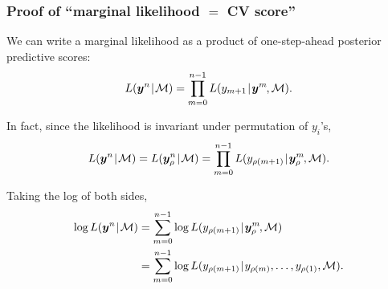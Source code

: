 \documentclass[18pt, handout]{beamer}
\newcommand{\defineTightSpacing}{%
	\setlength{\abovedisplayskip}{.25\baselineskip}%
	\setlength{\belowdisplayskip}{.25\baselineskip}%
}
\renewcommand{\textsc}[1]{{\small \MakeUppercase{#1}}}
\newcommand{\given}{\thinnerspace | \thinnerspace}
\newcommand{\thinnerspace}{\mskip.5\thinmuskip}
\newcommand{\negthinnerspace}{\mskip-.5\thinmuskip}
\newcommand{\likelihood}{L}
\newcommand{\by}{\bm{y}}
\newcommand{\loss}{\mathcal{L}}
\newcommand{\modelSymbol}{\mathcal{M}}
\newcommand{\permutation}{\rho}
\newcommand{\trainingSize}{m}
\newcommand{\testSampleIndex}{i}
\newcommand{\testOutcome}{y_{\permutation(\testSampleIndex)}} %
\newcommand{\testOutcomePredicted}{\widehat{y}_{\permutation(\testSampleIndex)}^{\, \trainingSize}}
\begin{document}
\begin{frame}
\frametitle{Proof of ``marginal likelihood $=$ {\large CV} score''}
We can write a marginal likelihood as a product of one-step-ahead posterior predictive scores:
\vspace*{-.3\baselineskip}
\begin{equation*} \defineTightSpacing%
\likelihood(\by^n \given \modelSymbol)
	= \prod_{m = 0}^{n - 1} \likelihood(y_{\trainingSize + 1} \given \by^\trainingSize\negthinnerspace, \modelSymbol).
\end{equation*}

In fact, since the likelihood is invariant under permutation of $y_i$'s,
\vspace*{-.15\baselineskip}
\begin{equation*} \defineTightSpacing%
\likelihood(\by^n \given \modelSymbol)
	= \likelihood(\by_{\permutation}^n \given \modelSymbol)
	= \prod_{m = 0}^{n - 1} \likelihood(y_{\permutation(\trainingSize + 1)} \given \by_\permutation^\trainingSize\negthinnerspace, \modelSymbol).
\end{equation*}

Taking the log of both sides, 
\begin{equation*} \defineTightSpacing%
\begin{aligned}
\log \likelihood(\by^n \given \modelSymbol)
	&= \sum_{m = 0}^{n - 1} \log \likelihood(y_{\permutation(\trainingSize + 1)} \given \by_\permutation^\trainingSize\negthinnerspace, \modelSymbol) \\
	&= \sum_{m = 0}^{n - 1} \log \likelihood(y_{\permutation(\trainingSize + 1)} \given y_{\permutation(\trainingSize)}, \ldots, y_{\permutation(1)}, \modelSymbol).
\end{aligned}
\end{equation*}

\end{frame}
\end{document}
